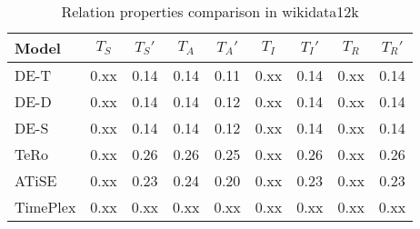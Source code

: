\begin{table*}[htb]
\centering
\begin{minipage}{0.95\textwidth}
\centering
\caption{Relation properties comparison in wikidata12k}
\vspace{-3mm}

\begin{tabular}{l|cc|cc|cc|cc}\hline
Model       & $T_S$ & $T_S'$ & $T_A$ & $T_A'$ & $T_I$ & $T_I'$ & $T_R$ & $T_R'$ \\ \hline
DE-T & 0.xx & 0.14 & 0.14 & 0.11 & 0.xx & 0.14 & 0.xx & 0.14 \\ 
DE-D & 0.xx & 0.14 & 0.14 & 0.12 & 0.xx & 0.14 & 0.xx & 0.14 \\ 
DE-S & 0.xx & 0.14 & 0.14 & 0.12 & 0.xx & 0.14 & 0.xx & 0.14 \\ 
TeRo & 0.xx & 0.26 & 0.26 & 0.25 & 0.xx & 0.26 & 0.xx & 0.26 \\ 
ATiSE & 0.xx & 0.23 & 0.24 & 0.20 & 0.xx & 0.23 & 0.xx & 0.23 \\ 
TimePlex & 0.xx & 0.xx & 0.xx & 0.xx & 0.xx & 0.xx & 0.xx & 0.xx \\ 
 \hline
\end{tabular}

\label{fig:relation_properties_wikidata12k_comparison}
\end{minipage}
\end{table*}

